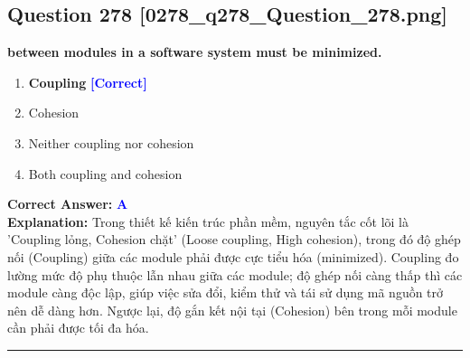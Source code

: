 \documentclass[11pt,a4paper]{article}
\begin{document}
\begin{minipage}{\textwidth}
\subsection*{Question 278 \quad \footnotesize{[0278\_q278\_Question\_278.png]}}
\noindent \textbf{between modules in a software system must be minimized.}

\begin{enumerate}[label=\Alph*.]
    \item \textbf{Coupling} \hfill \textcolor{blue}{\textbf{[Correct]}}
    \item Cohesion
    \item Neither coupling nor cohesion
    \item Both coupling and cohesion
\end{enumerate}

\noindent \textbf{Correct Answer:} \textcolor{blue}{\textbf{A}} \\[2pt]
\noindent \textbf{Explanation:} Trong thiết kế kiến trúc phần mềm, nguyên tắc cốt lõi là 'Coupling lỏng, Cohesion chặt' (Loose coupling, High cohesion), trong đó độ ghép nối (Coupling) giữa các module phải được cực tiểu hóa (minimized). Coupling đo lường mức độ phụ thuộc lẫn nhau giữa các module; độ ghép nối càng thấp thì các module càng độc lập, giúp việc sửa đổi, kiểm thử và tái sử dụng mã nguồn trở nên dễ dàng hơn. Ngược lại, độ gắn kết nội tại (Cohesion) bên trong mỗi module cần phải được tối đa hóa.

\par\vspace{0.3cm}
\hrule
\vspace{0.3cm}
\end{minipage}
\end{document}
